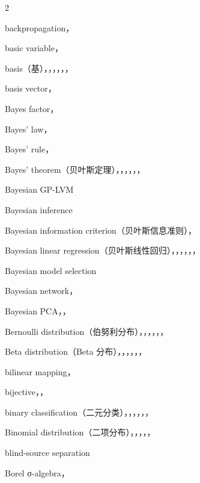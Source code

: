 \begin{multicols}{2}
\medskip{}\par\smallskip
\noindent backpropagation，\par
\noindent basic variable，\par
\noindent basis（基），，，，，，\par
\noindent basis vector，\par
\noindent Bayes factor，\par
\noindent Bayes’ law，\par
\noindent Bayes’ rule，\par
\noindent Bayes’ theorem（贝叶斯定理），，，，，，\par
\noindent Bayesian GP-LVM\par
\noindent Bayesian inference\par
\noindent Bayesian information criterion（贝叶斯信息准则），\par
\noindent Bayesian linear regression（贝叶斯线性回归），，，，，，\par
\noindent Bayesian model selection\par
\noindent Bayesian network，\par
\noindent Bayesian PCA，，\par
\noindent Bernoulli distribution（伯努利分布），，，，，，\par
\noindent Beta distribution（Beta 分布），，，，，，\par
\noindent bilinear mapping，\par
\noindent bijective，，\par
\noindent binary classification（二元分类），，，，，，\par
\noindent Binomial distribution（二项分布），，，，，\par
\noindent blind-source separation\par
\noindent Borel σ-algebra，\par


\end{multicols}
